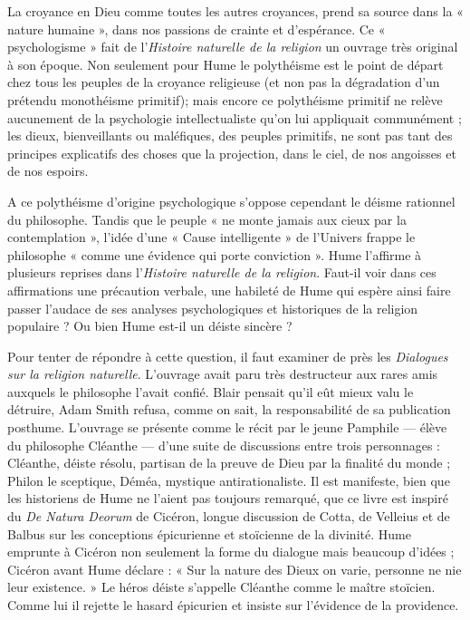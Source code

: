 La croyance en Dieu comme toutes les autres croyances,
prend sa source dans la « nature humaine », dans nos
passions de crainte et d'espérance. Ce « psychologisme »
fait de l'{\it Histoire naturelle de la religion} un ouvrage très
original à son époque. Non seulement pour Hume le
polythéisme est le point de départ chez tous les peuples
de la croyance religieuse (et non pas la dégradation d’un
prétendu monothéisme primitif); mais encore ce polythéisme
primitif ne relève aucunement de la psychologie
intellectualiste qu’on lui appliquait communément ; les
dieux, bienveillants ou maléfiques, des peuples primitifs,
ne sont pas tant des principes explicatifs des choses que
la projection, dans le ciel, de nos angoisses et de nos espoirs.

A ce polythéisme d’origine psychologique s'oppose
cependant le déisme rationnel du philosophe. Tandis que
le peuple « ne monte jamais aux cieux par la contemplation »,
l’idée d’une « Cause intelligente » de l'Univers
frappe le philosophe « comme une évidence qui porte
conviction ». Hume l’affirme à plusieurs reprises dans
l'{\it Histoire naturelle de la religion}. Faut-il voir dans ces
affirmations une précaution verbale, une habileté de Hume
qui espère ainsi faire passer l'audace de ses analyses psychologiques
et historiques de la religion populaire ? Ou
bien Hume est-il un déiste sincère ?

Pour tenter de répondre à cette question, il faut examiner
de près les {\it Dialogues sur la religion naturelle}. L'ouvrage
avait paru très destructeur aux rares amis auxquels le
philosophe l’avait confié. Blair pensait qu’il eût mieux
valu le détruire, Adam Smith refusa, comme on sait, la
responsabilité de sa publication posthume. L'ouvrage se
présente comme le récit par le jeune Pamphile — élève
du philosophe Cléanthe — d’une suite de discussions entre
trois personnages : Cléanthe, déiste résolu, partisan de la
preuve de Dieu par la finalité du monde ; Philon le sceptique,
Déméa, mystique antirationaliste. Il est manifeste,
bien que les historiens de Hume ne l’aient pas toujours
remarqué, que ce livre est inspiré du {\it De Natura Deorum}
de Cicéron, longue discussion de Cotta, de Velleius et de
Balbus sur les conceptions épicurienne et stoïcienne de la
divinité. Hume emprunte à Cicéron non seulement la
forme du dialogue mais beaucoup d’idées ; Cicéron avant
Hume déclare : « Sur la nature des Dieux on varie, personne ne
nie leur existence. » Le héros déiste s’appelle
Cléanthe comme le maître stoïcien. Comme lui il rejette
le hasard épicurien et insiste sur l’évidence de la providence.

